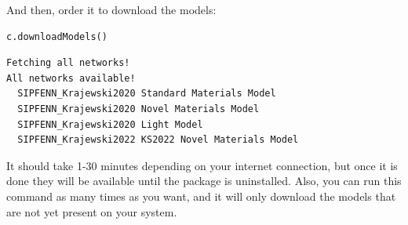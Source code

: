 And then, order it to download the models:

\begin{verbatim}
c.downloadModels()
\end{verbatim}

\begin{verbatim}
Fetching all networks!
All networks available!
  SIPFENN_Krajewski2020 Standard Materials Model
  SIPFENN_Krajewski2020 Novel Materials Model
  SIPFENN_Krajewski2020 Light Model
  SIPFENN_Krajewski2022 KS2022 Novel Materials Model
\end{verbatim}

It should take 1-30 minutes depending on your internet connection, but
once it is done they will be available until the package is uninstalled.
Also, you can run this command as many times as you want, and it will
only download the models that are not yet present on your system.
